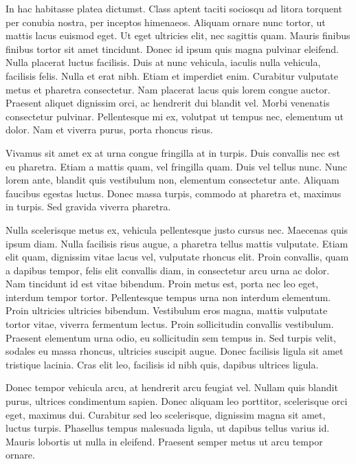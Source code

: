 In hac habitasse platea dictumst. Class aptent taciti sociosqu ad litora
torquent per conubia nostra, per inceptos himenaeos. Aliquam ornare nunc
tortor, ut mattis lacus euismod eget. Ut eget ultricies elit, nec sagittis
quam. Mauris finibus finibus tortor sit amet tincidunt. Donec id ipsum quis
magna pulvinar eleifend. Nulla placerat luctus facilisis. Duis at nunc
vehicula, iaculis nulla vehicula, facilisis felis. Nulla et erat nibh. Etiam et
imperdiet enim. Curabitur vulputate metus et pharetra consectetur. Nam placerat
lacus quis lorem congue auctor. Praesent aliquet dignissim orci, ac hendrerit
dui blandit vel. Morbi venenatis consectetur pulvinar. Pellentesque mi ex,
volutpat ut tempus nec, elementum ut dolor. Nam et viverra purus, porta rhoncus
risus.

Vivamus sit amet ex at urna congue fringilla at in turpis. Duis convallis nec
est eu pharetra. Etiam a mattis quam, vel fringilla quam. Duis vel tellus nunc.
Nunc lorem ante, blandit quis vestibulum non, elementum consectetur ante.
Aliquam faucibus egestas luctus. Donec massa turpis, commodo at pharetra et,
maximus in turpis. Sed gravida viverra pharetra.

Nulla scelerisque metus ex, vehicula pellentesque justo cursus nec. Maecenas
quis ipsum diam. Nulla facilisis risus augue, a pharetra tellus mattis
vulputate. Etiam elit quam, dignissim vitae lacus vel, vulputate rhoncus elit.
Proin convallis, quam a dapibus tempor, felis elit convallis diam, in
consectetur arcu urna ac dolor. Nam tincidunt id est vitae bibendum. Proin
metus est, porta nec leo eget, interdum tempor tortor. Pellentesque tempus urna
non interdum elementum. Proin ultricies ultricies bibendum. Vestibulum eros
magna, mattis vulputate tortor vitae, viverra fermentum lectus. Proin
sollicitudin convallis vestibulum. Praesent elementum urna odio, eu
sollicitudin sem tempus in. Sed turpis velit, sodales eu massa rhoncus,
ultricies suscipit augue. Donec facilisis ligula sit amet tristique lacinia.
Cras elit leo, facilisis id nibh quis, dapibus ultrices ligula.

Donec tempor vehicula arcu, at hendrerit arcu feugiat vel. Nullam quis blandit
purus, ultrices condimentum sapien. Donec aliquam leo porttitor, scelerisque
orci eget, maximus dui. Curabitur sed leo scelerisque, dignissim magna sit
amet, luctus turpis. Phasellus tempus malesuada ligula, ut dapibus tellus
varius id. Mauris lobortis ut nulla in eleifend. Praesent semper metus ut arcu
tempor ornare.

